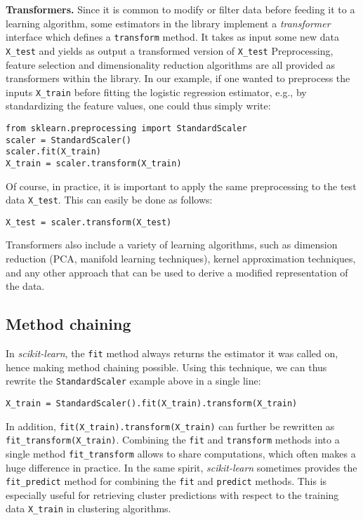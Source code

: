 \documentclass{llncs}
\newcommand{\sklearn}{\textit{scikit-learn}\xspace}
\begin{document}
\textbf{Transformers.} Since it is common to modify or filter data before
feeding it to a learning algorithm, some estimators in the library implement a
\textit{transformer} interface which defines a \texttt{transform} method. It
takes as input some new data \texttt{X\_test} and yields as output a transformed
version of \texttt{X\_test} Preprocessing, feature selection and dimensionality
reduction algorithms are all provided as transformers within the library.  In
our example, if one wanted to preprocess the inputs \texttt{X\_train} before
fitting the logistic regression estimator, e.g., by standardizing the feature
values, one could thus simply write:
\begin{verbatim}
from sklearn.preprocessing import StandardScaler
scaler = StandardScaler()
scaler.fit(X_train)
X_train = scaler.transform(X_train)
\end{verbatim}
Of course, in practice, it is important to apply the same preprocessing to the
test data \texttt{X\_test}. This can easily be done as follows:
\begin{verbatim}
X_test = scaler.transform(X_test)
\end{verbatim}
Transformers also include a variety of learning algorithms, such as
dimension reduction (PCA, manifold learning techniques), kernel
approximation techniques, and any other approach that can be used to
derive a modified representation of the data.

\subsection{Method chaining}

In \sklearn, the \texttt{fit} method always returns the estimator
it was called on, hence making method chaining possible.  Using this technique,
we can thus rewrite the \texttt{StandardScaler} example above in a single line:
\begin{verbatim} 
X_train = StandardScaler().fit(X_train).transform(X_train)
\end{verbatim} 
In addition, \texttt{fit(X\_train).transform(X\_train)} can further
be rewritten as \texttt{fit\_transform(X\_train)}.  Combining the \texttt{fit}
and \texttt{transform} methods into a single method \texttt{fit\_transform}
allows to share computations, which often makes a huge difference in practice.
In the same spirit, \sklearn sometimes provides the
\texttt{fit\_predict} method for combining the \texttt{fit} and \texttt{predict}
methods. This is especially useful for retrieving cluster predictions with
respect to the training data \texttt{X\_train} in clustering algorithms.
\end{document}
